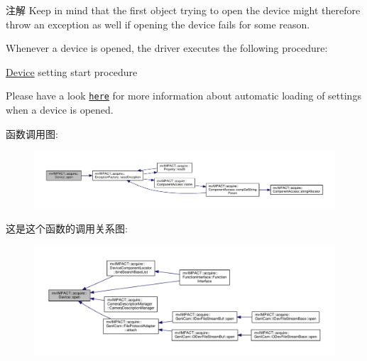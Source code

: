 \begin{DoxyNote}{注解}
Keep in mind that the first object trying to open the device might therefore throw an exception as well if opening the device fails for some reason.
\end{DoxyNote}
Whenever a device is opened, the driver executes the following procedure\+:

 \begin{center}\hyperlink{classmv_i_m_p_a_c_t_1_1acquire_1_1_device}{Device} setting start procedure\end{center} 

Please have a look \href{../GUI_page_mvPropView.html}{\tt here} for more information about automatic loading of settings when a device is opened. 

函数调用图\+:
\nopagebreak
\begin{figure}[H]
\begin{center}
\leavevmode
\includegraphics[width=350pt]{classmv_i_m_p_a_c_t_1_1acquire_1_1_device_adf4cb4c232b202a51c7161caf9b36165_cgraph}
\end{center}
\end{figure}




这是这个函数的调用关系图\+:
\nopagebreak
\begin{figure}[H]
\begin{center}
\leavevmode
\includegraphics[width=350pt]{classmv_i_m_p_a_c_t_1_1acquire_1_1_device_adf4cb4c232b202a51c7161caf9b36165_icgraph}
\end{center}
\end{figure}


